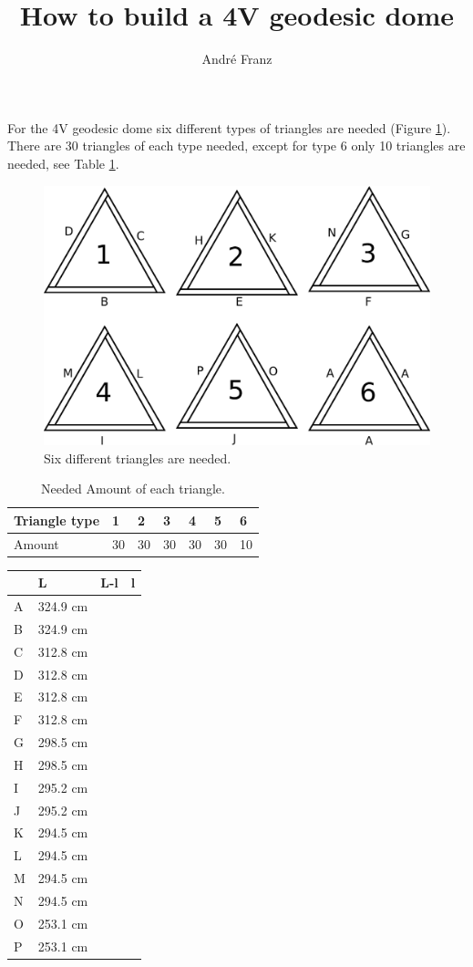 \documentclass[a4paper,12pt]{article}
\title{How to build a 4V geodesic dome}
\author{Andr\'{e} Franz}
\date{}
\begin{document}
\maketitle

For the 4V geodesic dome six different types of triangles are needed (Figure \ref{fig:triangles}). There are 30 triangles of each type needed, except for type 6 only 10 triangles are needed, see Table \ref{tab:amountoftriangles}.

\begin{figure}
	\centering
	\includegraphics[width=\linewidth]{../images/4v_triangles.eps}
	\caption{Six different triangles are needed.}
	\label{fig:triangles}
\end{figure}


\begin{table}
	\centering
	\caption{Needed Amount of each triangle.}
	\begin{tabular}{l|llllll}
		Triangle type	& 1		& 2		& 3		& 4		& 5		& 6	\\ \hline
		Amount			& 30	& 30	& 30	& 30	& 30	& 10
	\end{tabular}
\label{tab:amountoftriangles}
\end{table}

\begin{table}
	\begin{tabular}{l|lll}
			& L			& L-l	& l		\\	\hline
		A	& 324.9 cm	&		&		\\
		B	& 324.9 cm	&		&		\\
		C	& 312.8 cm	&		&		\\
		D	& 312.8 cm	&		&		\\
		E	& 312.8 cm	&	&	\\
		F	& 312.8 cm	&	&	\\
		G	& 298.5 cm	&	&	\\
		H	& 298.5 cm	&	&	\\
		I	& 295.2 cm 	&	&	\\
		J	& 295.2 cm	&	&	\\
		K	& 294.5 cm	&	&	\\
		L	& 294.5 cm	&	&	\\
		M	& 294.5 cm	&	&	\\
		N	& 294.5 cm	&	&	\\
		O	& 253.1 cm	&	&	\\
		P	& 253.1 cm	&	&	
	\end{tabular}
\end{table}
\end{document}

